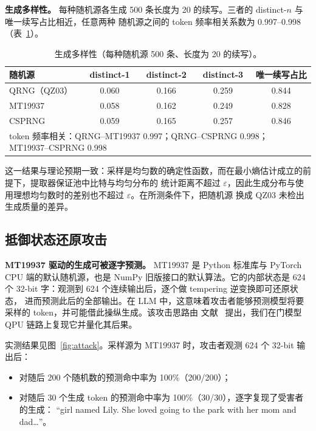 \documentclass[11pt]{article}
\begin{document}
\textbf{生成多样性。} 每种随机源各生成 500 条长度为 20 的续写。三者的 distinct-$n$ 与唯一续写占比相近，任意两种%
随机源之间的 token 频率相关系数为 0.997--0.998（表~\ref{tab:diversity}）。

\begin{table}[t]\centering\small
\caption{生成多样性（每种随机源 500 条、长度为 20 的续写）。}
\label{tab:diversity}
\begin{tabular}{lcccc}
\toprule
随机源 & distinct-1 & distinct-2 & distinct-3 & 唯一续写占比 \\
\midrule
QRNG（QZ03） & 0.060 & 0.166 & 0.259 & 0.844 \\
MT19937 & 0.058 & 0.162 & 0.249 & 0.828 \\
CSPRNG & 0.059 & 0.165 & 0.257 & 0.846 \\
\midrule
\multicolumn{5}{l}{\footnotesize token 频率相关：QRNG--MT19937 0.997；QRNG--CSPRNG 0.998；MT19937--CSPRNG 0.998} \\
\bottomrule
\end{tabular}
\end{table}

这一结果与理论预期一致：采样是均匀数的确定性函数，而在最小熵估计成立的前提下，提取器保证池中比特与均匀分布的%
统计距离不超过 $\varepsilon$，因此生成分布与使用理想均匀数时的差别也不超过 $\varepsilon$。在所测条件下，把随机源%
换成 QZ03 未检出生成质量的差异。

\subsection{抵御状态还原攻击}
\label{sec:attack}
\textbf{MT19937 驱动的生成可被逐字预测。} MT19937 是 Python 标准库与 PyTorch CPU 端的默认随机源，也是 NumPy
旧版接口的默认算法。它的内部状态是 624 个 32-bit 字：观测到 624 个连续输出后，逐个做 tempering 逆变换即可还原状态，%
进而预测此后的全部输出。在 LLM 中，这意味着攻击者能够预测模型将要采样的 token，并可能借此操纵生成。该攻击思路由%
文献~\cite{seedhijack} 提出，我们在门模型 QPU 链路上复现它并量化其后果。

实测结果见图~\ref{fig:attack}。采样源为 MT19937 时，攻击者观测 624 个 32-bit 输出后：
\begin{itemize}
  \item 对随后 200 个随机数的预测命中率为 100\%（200/200）；
  \item 对随后 30 个生成 token 的预测命中率为 100\%（30/30），逐字复现了受害者的生成：%
        “girl named Lily. She loved going to the park with her mom and dad…”。
\end{itemize}
\end{document}
